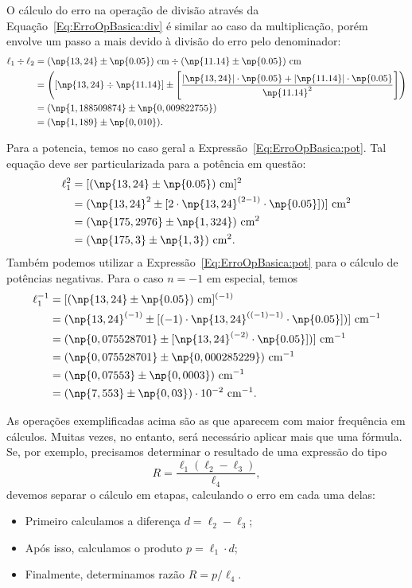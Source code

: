 O cálculo do erro na operação de divisão através da Equação~\eqref{Eq:ErroOpBasica:div} é similar ao caso da multiplicação, porém envolve um passo a mais devido à divisão do erro pelo denominador:
\begin{align}
    \ell_1 \div \ell_2 &= (\np{13,24} \pm \np{0.05})~\rm{cm} \div (\np{11.14} \pm \np{0.05})~\rm{cm} \\
    &= \left([\np{13,24} \div \np{11.14}] \pm \left[\frac{|\np{13,24}|\cdot\np{0.05} + |\np{11.14}|\cdot\np{0.05}}{\np{11.14}^2}\right]\right) \\
    &= (\np{1,188509874} \pm \np{0,009822755}) \\
    &= (\np{1,189} \pm \np{0,010}).
\end{align}

Para a potencia, temos no caso geral a Expressão~\eqref{Eq:ErroOpBasica:pot}. Tal equação deve ser particularizada para a potência em questão:
\begin{align}
    \ell_1^2 &= [(\np{13,24} \pm \np{0.05})~\rm{cm}]^2 \\
    &= (\np{13,24}^2 \pm [2 \cdot \np{13,24}^{(2-1)} \cdot \np{0.05}])]~\rm{cm}^2 \\
    &= (\np{175,2976} \pm \np{1,324})~\rm{cm}^2 \\
    &= (\np{175,3} \pm \np{1,3})~\rm{cm}^2.
\end{align}
%
Também podemos utilizar a Expressão~\eqref{Eq:ErroOpBasica:pot} para o cálculo de potências negativas. Para o caso $n = -1$ em especial, temos
\begin{align}
    \ell_1^{-1} &= [(\np{13,24} \pm \np{0.05})~\rm{cm}]^{(-1)} \\
    &= (\np{13,24}^{(-1)} \pm [(-1) \cdot \np{13,24}^{((-1)-1)} \cdot \np{0.05}])]~\rm{cm}^{-1} \\
    &= (\np{0,075528701} \pm [\np{13,24}^{(-2)} \cdot \np{0.05}])]~\rm{cm}^{-1} \\
    &= (\np{0,075528701} \pm \np{0,000285229})~\rm{cm}^{-1} \\
    &= (\np{0,07553} \pm \np{0,0003})~\rm{cm}^{-1} \\
    &= (\np{7,553} \pm \np{0,03})\cdot 10^{-2}~\rm{cm}^{-1}.
\end{align}

As operações exemplificadas acima são as que aparecem com maior frequência em cálculos. Muitas vezes, no entanto, será necessário aplicar mais que uma fórmula. Se, por exemplo, precisamos determinar o resultado de uma expressão do tipo
\begin{equation}
    R = \frac{\ell_1 (\ell_2 - \ell_3)}{\ell_4},
\end{equation}
%
devemos separar o cálculo em etapas, calculando o erro em cada uma delas:
\begin{itemize}
    \item Primeiro calculamos a diferença $d = \ell_2 - \ell_3$;
    \item Após isso, calculamos o produto $p = \ell_1 \cdot d$;
    \item Finalmente, determinamos razão $R = p / \ell_4$.
\end{itemize}

